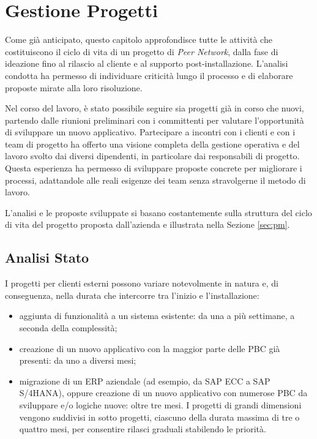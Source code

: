 \chapter{Gestione Progetti}
\label{chap:pm}


%

Come già anticipato, questo capitolo approfondisce tutte le attività che costituiscono il ciclo di vita
di un progetto di \textit{Peer Network}, dalla fase di ideazione fino al rilascio al cliente e al supporto post-installazione.
L’analisi condotta ha permesso di individuare criticità lungo il processo e di elaborare proposte mirate alla loro risoluzione.

Nel corso del lavoro, è stato possibile seguire sia progetti già in corso che nuovi, partendo dalle riunioni
preliminari con i committenti per valutare l’opportunità di sviluppare un nuovo applicativo. Partecipare a incontri
con i clienti e con i team di progetto ha offerto una visione completa della gestione operativa e del lavoro
svolto dai diversi dipendenti, in particolare dai responsabili di progetto. Questa esperienza ha permesso di
sviluppare proposte concrete per migliorare i processi, adattandole alle reali esigenze dei team senza stravolgerne il metodo di lavoro.

L'analisi e le proposte sviluppate si basano costantemente sulla struttura del ciclo di vita del progetto proposta dall'azienda
e illustrata nella Sezione \ref{sec:pm}.

\section{Analisi Stato}
I progetti per clienti esterni possono variare notevolmente in natura e, di conseguenza, nella durata che intercorre tra l’inizio e l'installazione:
\begin{itemize}
    \item aggiunta di funzionalità a un sistema esistente: da una a più settimane, a seconda della complessità;
    \item creazione di un nuovo applicativo con la maggior parte delle \ac{PBC} già presenti: da uno a diversi mesi;
    \item migrazione di un \ac{ERP} aziendale (ad esempio, da SAP ECC a SAP S/4HANA), oppure creazione di un nuovo
    applicativo con numerose \ac{PBC} da sviluppare e/o logiche nuove: oltre tre mesi. I progetti di grandi dimensioni
    vengono suddivisi in sotto progetti, ciascuno della durata massima di tre o quattro mesi, per consentire rilasci graduali stabilendo le priorità.
\end{itemize}

